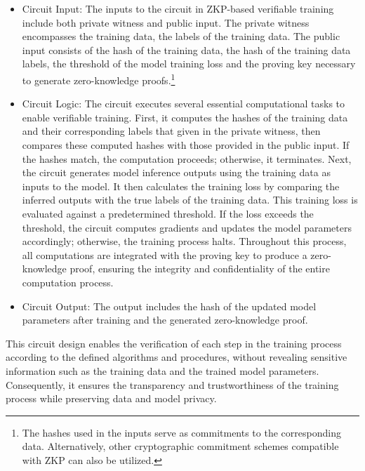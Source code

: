 \documentclass[journal]{IEEEtran}
\begin{document}
\begin{itemize}


\item {Circuit Input}: The inputs to the circuit in ZKP-based verifiable training include both private witness and public input. The private witness encompasses the training data, the labels of the training data. The public input consists of the hash of the training data, the hash of the training data labels, the threshold of the model training loss and the proving key necessary to generate zero-knowledge proofs.\footnote{The hashes used in the inputs serve as commitments to the corresponding data. Alternatively, other cryptographic commitment schemes compatible with ZKP can also be utilized.}

\item {Circuit Logic}: The circuit executes several essential computational tasks to enable verifiable training. First, it computes the hashes of the training data and their corresponding labels that given in the private witness, then compares these computed hashes with those provided in the public input. If the hashes match, the computation proceeds; otherwise, it terminates. Next, the circuit generates model inference outputs using the training data as inputs to the model. It then calculates the training loss by comparing the inferred outputs with the true labels of the training data. This training loss is evaluated against a predetermined threshold. If the loss exceeds the threshold, the circuit computes gradients and updates the model parameters accordingly; otherwise, the training process halts. Throughout this process, all computations are integrated with the proving key to produce a zero-knowledge proof, ensuring the integrity and confidentiality of the entire computation process.

\item {Circuit Output}: The output includes the hash of the updated model parameters after training and the generated zero-knowledge proof. 

\end{itemize}

This circuit design enables the verification of each step in the training process according to the defined algorithms and procedures, without revealing sensitive information such as the training data and the trained model parameters. Consequently, it ensures the transparency and trustworthiness of the training process while preserving data and model privacy. 
\end{document}
